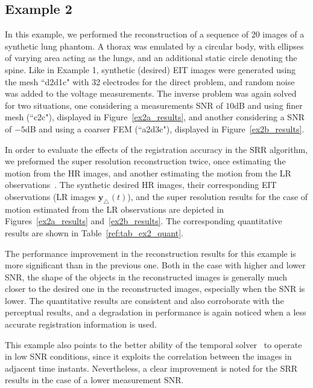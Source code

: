\documentclass[10pt]{IEEEtran}
\newcommand{\vy}{\mathbf{y}}
\begin{document}
\subsection{Example 2}

In this example, we performed the reconstruction of a sequence of 20 images of a synthetic lung phantom. A thorax was emulated by a circular body, with ellipses of varying area acting as the lungs, and an additional static circle denoting the spine.
%
Like in Example 1, synthetic (desired) EIT images were generated using the mesh ``d2d1c" with 32 electrodes for the direct problem, and random noise was added to the voltage measurements.
%
The inverse problem was again solved for two situations, one considering a measurements SNR of $10$dB and using finer mesh (``c2c"), displayed in Figure~\ref{ex2a_results}, and another considering a SNR of $-5$dB and using a coarser FEM (``a2d3c"),  displayed in Figure~\ref{ex2b_results}.


In order to evaluate the effects of the registration accuracy in the SRR algorithm, we preformed the super resolution reconstruction twice, once estimating the motion from the HR images, and another estimating the motion from the LR observations~\cite{Sun10}.
%
The synthetic desired HR images, their corresponding EIT observations (LR images $\vy_{\triangle}(t)$), and the super resolution results for the case of motion estimated from the LR observations are depicted in Figures~\ref{ex2a_results} and~\ref{ex2b_results}.
%
The corresponding quantitative results are shown in Table~\ref{ref:tab_ex2_quant}.




The performance improvement in the reconstruction results for this example is more significant than in the previous one. Both in the case with higher and lower SNR, the shape of the objects in the reconstructed images is generally much closer to the desired one in the reconstructed images, especially when the SNR is lower.
%
The quantitative results are consistent and also corroborate with the perceptual results, and a degradation in performance is again noticed when a less accurate registration information is used.


This example also points to the better ability of the temporal solver~\cite{adler2007temporalEIT} to operate in low SNR conditions, since it exploits the correlation between the images in adjacent time instants. 
%
Nevertheless, a clear improvement is noted for the SRR results in the case of a lower measurement SNR.
\end{document}
